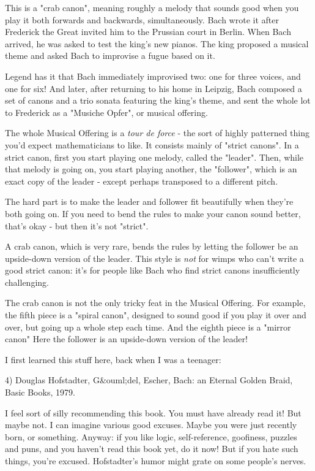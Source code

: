 This is a "crab canon", meaning roughly a melody that sounds
good when you play it both forwards and backwards, simultaneously.
Bach wrote it after Frederick the Great invited him to the Prussian
court in Berlin.  When Bach arrived, he was asked to test the king's
new pianos.  The king proposed a musical theme and asked Bach to
improvise a fugue based on it.

Legend has it that Bach immediately improvised two: one for three 
voices, and one for six!  And later, after returning to his home in 
Leipzig, Bach composed a set of canons and a trio sonata featuring 
the king's theme, and sent the whole lot to Frederick as 
a "Musiche Opfer", or musical offering.

The whole Musical Offering is a \emph{tour de force} - the sort of
highly patterned thing you'd expect mathematicians to like.  It
consists mainly of "strict canons".  In a strict canon,
first you start playing one melody, called the "leader".
Then, while that melody is going on, you start playing another, the
"follower", which is an exact copy of the leader - except
perhaps transposed to a different pitch.

The hard part is to make the leader and follower fit beautifully when
they're both going on.  If you need to bend the rules to make your
canon sound better, that's okay - but then it's not
"strict".

A crab canon, which is very rare, bends the rules by letting the
follower be an upside-down version of the leader.  This style is
\emph{not} for wimps who can't write a good strict canon: it's for
people like Bach who find strict canons insufficiently challenging.  

The crab canon is not the only tricky feat in the Musical Offering.
For example, the fifth piece is a "spiral canon", designed
to sound good if you play it over and over, but going up a whole step
each time.  And the eighth piece is a "mirror canon" Here
the follower is an upside-down version of the leader!

I first learned this stuff here, back when I was a teenager:

4) Douglas Hofstadter, G&ouml;del, Escher, Bach: an Eternal Golden Braid,
Basic Books, 1979.

I feel sort of silly recommending this book.  You must have already
read it!  But maybe not.  I can imagine various good excuses.  Maybe
you were just recently born, or something.  Anyway: if you like logic,
self-reference, goofiness, puzzles and puns, and you haven't read this
book yet, do it now!  But if you hate such things, you're excused.
Hofstadter's humor might grate on some people's nerves.

